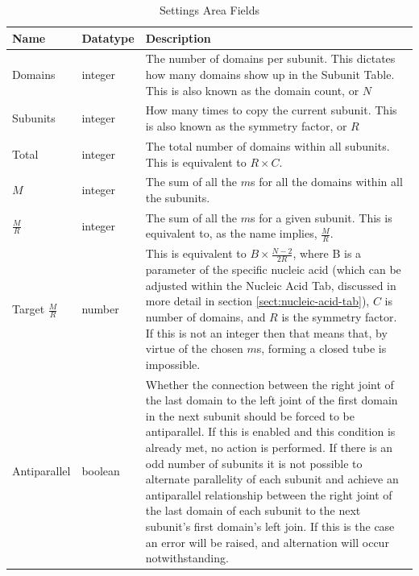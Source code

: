\documentclass[titlepage]{article}
\begin{document}
\begin{longtable}{|p{.9in}|p{1in}|p{3in}|}
	\caption{Settings Area Fields} \\

	Name & Datatype & Description \\
	\hline
	
	Domains & integer & The number of domains per subunit. This dictates how many domains show up in the Subunit Table. This is also known as the domain count, or $N$ \\
	\hline
	
	Subunits & integer & How many times to copy the current subunit. This is also known as the symmetry factor, or $R$ \\
	\hline
	
	Total & integer & The total number of domains within all subunits. This is equivalent to $R \times C$. \\
	\hline
	
	$M$ & integer & The sum of all the $m$s for all the domains within all the subunits. \\
	\hline
	
	$\frac{M}{R}$ & integer & The sum of all the $m$s for a given subunit. This is equivalent to, as the name implies, $\frac{M}{R}$. \\
	\hline
	
	Target $\frac{M}{R}$ & number & This is equivalent to $B \times \frac{N-2}{2R}$, where B is a parameter of the specific nucleic acid (which can be adjusted within the Nucleic Acid Tab, discussed in more detail in section \ref{sect:nucleic-acid-tab}), $C$ is number of domains, and $R$ is the symmetry factor. If this is not an integer then that means that, by virtue of the chosen $m$s, forming a closed tube is impossible. \\
	\hline
	
	Antiparallel & boolean & Whether the connection between the right joint of the last domain to the left joint of the first domain in the next subunit should be forced to be antiparallel. If this is enabled and this condition is already met, no action is performed. If there is an odd number of subunits it is not possible to alternate parallelity of each subunit and achieve an antiparallel relationship between the right joint of the last domain of each subunit to the next subunit's first domain's left join. If this is the case an error will be raised, and alternation will occur notwithstanding. \\
\end{longtable}
\end{document}
